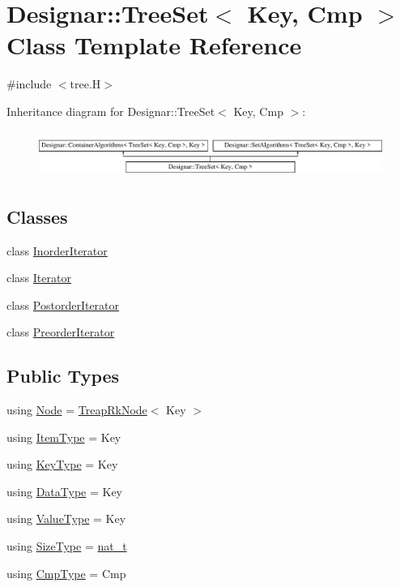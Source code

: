 \hypertarget{class_designar_1_1_tree_set}{}\section{Designar\+:\+:Tree\+Set$<$ Key, Cmp $>$ Class Template Reference}
\label{class_designar_1_1_tree_set}


{\ttfamily \#include $<$tree.\+H$>$}

Inheritance diagram for Designar\+:\+:Tree\+Set$<$ Key, Cmp $>$\+:\begin{figure}[H]
\begin{center}
\leavevmode
\includegraphics[height=1.513514cm]{class_designar_1_1_tree_set}
\end{center}
\end{figure}
\subsection*{Classes}
\begin{DoxyCompactItemize}
\item 
class \hyperlink{class_designar_1_1_tree_set_1_1_inorder_iterator}{Inorder\+Iterator}
\item 
class \hyperlink{class_designar_1_1_tree_set_1_1_iterator}{Iterator}
\item 
class \hyperlink{class_designar_1_1_tree_set_1_1_postorder_iterator}{Postorder\+Iterator}
\item 
class \hyperlink{class_designar_1_1_tree_set_1_1_preorder_iterator}{Preorder\+Iterator}
\end{DoxyCompactItemize}
\subsection*{Public Types}
\begin{DoxyCompactItemize}
\item 
using \hyperlink{class_designar_1_1_tree_set_a7409a9c1545c0e9e2fd6b84120713c99}{Node} = \hyperlink{class_designar_1_1_treap_rk_node}{Treap\+Rk\+Node}$<$ Key $>$
\item 
using \hyperlink{class_designar_1_1_tree_set_a3d4237612f151579b02ff5c7735df07a}{Item\+Type} = Key
\item 
using \hyperlink{class_designar_1_1_tree_set_a28d9821de526b7d05f199b2d5d308335}{Key\+Type} = Key
\item 
using \hyperlink{class_designar_1_1_tree_set_a14a0b2c4c9e4db09003126217094bfe8}{Data\+Type} = Key
\item 
using \hyperlink{class_designar_1_1_tree_set_ab913d8de65b88abb61139cc3880ffe2d}{Value\+Type} = Key
\item 
using \hyperlink{class_designar_1_1_tree_set_a9a4926aa5faab169012a173c8cf5e4bb}{Size\+Type} = \hyperlink{namespace_designar_aa72662848b9f4815e7bf31a7cf3e33d1}{nat\+\_\+t}
\item 
using \hyperlink{class_designar_1_1_tree_set_a556e79c8fffe1f172a60848942672fa7}{Cmp\+Type} = Cmp
\end{DoxyCompactItemize}
